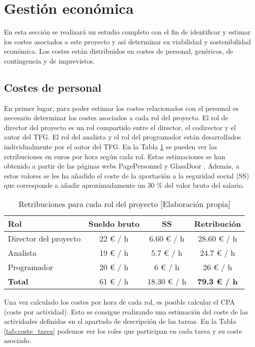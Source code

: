 \section{Gestión económica}
En esta sección se realizará un estudio completo con el fin de identificar y estimar los costes asociados a este proyecto y así determinar su viabilidad y sostenibilidad económica. Los costes están distribuidos en costes de personal, genéricos, de contingencia y de imprevistos.

\subsection{Costes de personal}
En primer lugar, para poder estimar los costes relacionados con el personal es necesario determinar los costes asociados a cada rol del proyecto. El rol de director del proyecto es un rol compartido entre el director, el codirector y el autor del TFG. El rol del analista y el rol del programador están desarrollados individualmente por el autor del TFG. En la Tabla \ref{tab:remuneracion} se pueden ver las retribuciones en euros por hora según cada rol. Estas estimaciones se han obtenido a partir de las páginas webs PagePersonnel \cite{pagePersonel} y GlassDoor \cite{glassdoor}. Además, a estos valores se les ha añadido el coste de la aportación a la seguridad social (SS) que corresponde a añadir aproximadamente un 30 \% del valor bruto del salario.  
\begin{table}[h]
    \begin{center}
        \begin{tabular}{ l  c  c  c }
        \textbf{Rol} & \textbf{Sueldo bruto} & \textbf{SS} & \textbf{Retribución} \\ \hline
        Director del proyecto & 22 € / h & 6.60 € / h & 28.60 € / h \\ 
        Analista & 19 € / h & 5.7 € / h & 24.7 € / h \\
        Programador & 20 € / h & 6 € / h & 26 € / h \\
        \hline
         \textbf{Total} & 61 € / h & 18.30 € / h & \textbf{79.3 € / h}  \\
        \end{tabular}
        \caption{Retribuciones para cada rol del proyecto [Elaboración propia]}
        \label{tab:remuneracion}
    \end{center}
\end{table}
Una vez calculado los costes por hora de cada rol, es posible calcular el CPA (coste por actividad). Esto se consigue realizando una estimación del coste de las actividades definidas en el apartado de descripción de las tareas. En la Tabla \ref{tab:coste_tarea} podemos ver los roles que participan en cada tarea y su coste asociado.
